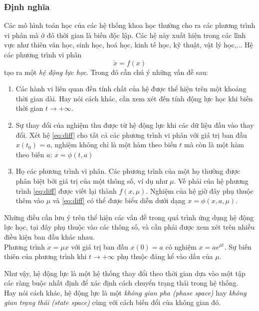 \documentclass[a4paper]{article}
\begin{document}
\subsubsection{Định nghĩa} 
Các mô hình toán học của các hệ thống khoa học thường cho ra các phương trình vi phân mà ở đó thời gian là biến độc lập. Các hệ này xuất hiện trong các lĩnh vực như thiên văn học, sinh học, hoá học, kinh tế học, kỹ thuật, vật lý học,... Hệ các phương trình vi phân 
\begin{equation}\label{eq:diff}
    \dot{x} = f(x)
\end{equation}
tạo ra một \textit{hệ động lực học}. Trong đó cần chú ý những vấn đề sau:
\begin{enumerate}[nolistsep]
    \item Các hành vi liên quan đến tính chất của hệ được thể hiện trên một khoảng thời gian dài. Hay nói cách khác, cần xem xét đến tính động lực học khi biến thời gian $t \rightarrow +\infty$.
    \item Sự thay đổi của nghiệm thu được từ hệ động lực khi các dữ liệu đầu vào thay đổi. Xét hệ \eqref{eq:diff} cho tất cả các phương trình vi phân với giá trị ban đầu $x(t_0) = a$, nghiệm không chỉ là một hàm theo biến $t$ mà còn là một hàm theo biến $a$: $x = \phi(t,a)$ 
    \item Họ các phương trình vi phân. Các phương trình của một họ thường được phân biệt bởi giá trị của một thông số, ví dụ như $\mu$. Vế phải của hệ phương trình \eqref{eq:diff} được viết lại thành $f(x,\mu)$. Nghiệm của hệ giờ đây phụ thuộc thêm vào $\mu$ và \eqref{eq:diff} có thể được biểu diễn dưới dạng $x = \phi(x,a,\mu)$.
\end{enumerate} \par
Những điều cần lưu ý trên thể hiện các vấn đề trong quá trình ứng dụng hệ động lực học, tại đây phụ thuộc vào các thông số, và cần phải được xem xét trên nhiều điều kiện ban đầu khác nhau. \\
Phương trình $\dot{x} = \mu x$ với giá trị ban đầu $x(0) = a$ có nghiệm $x = a e^{\mu t}$. Sự biến thiên của phương trình khi $t \rightarrow +\infty$ phụ thuộc đáng kể vào dấu của $\mu$. \par
Như vậy, hệ động lực là một hệ thống thay đổi theo thời gian dựa vào một tập các ràng buộc nhất định để xác định cách chuyển trạng thái trong hệ thống. \\
Hay nói cách khác, hệ động lực là một \textit{không gian pha (phase space)} hay \textit{không gian trạng thái (state space)} cùng với cách biến đổi của không gian đó. \par
\end{document}
